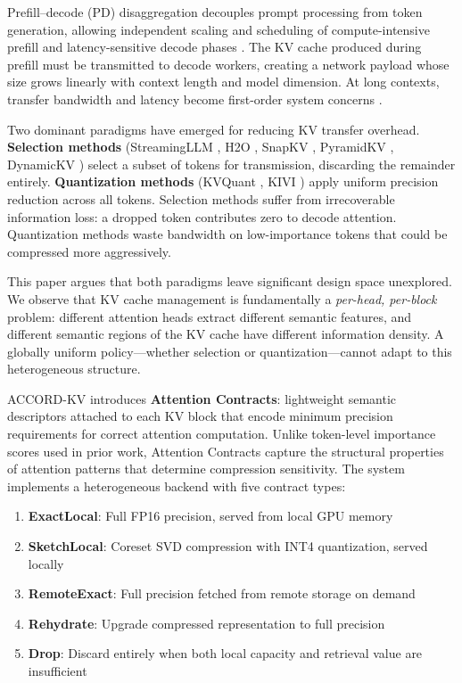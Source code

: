 \documentclass[11pt, a4paper, oneside]{article}
\theoremstyle{myplain}
\theoremstyle{mydefinition}
\theoremstyle{myremark}
\begin{document}
Pre\-fill--decode (PD) disaggregation decouples prompt processing from token generation, allowing independent scaling and scheduling of compute-intensive pre\-fill and latency-sensitive decode phases \cite{patel2024splitwise, zhong2024distserve, qin2024mooncake}. The KV cache produced during pre\-fill must be transmitted to decode workers, creating a network payload whose size grows linearly with context length and model dimension. At long contexts, transfer bandwidth and latency become first-order system concerns \cite{li2025flowkv, liu2026kvserve}.

Two dominant paradigms have emerged for reducing KV transfer overhead. \textbf{Selection methods} (StreamingLLM \cite{xiao2024efficient}, H2O \cite{zhang2023heavy}, SnapKV \cite{li2024snapkv}, PyramidKV \cite{cai2024pyramidkv}, DynamicKV \cite{zhou2024dynamic}) select a subset of tokens for transmission, discarding the remainder entirely. \textbf{Quantization methods} (KVQuant \cite{hooper2024kvquant}, KIVI \cite{liu2024kivi}) apply uniform precision reduction across all tokens. Selection methods suffer from irrecoverable information loss: a dropped token contributes zero to decode attention. Quantization methods waste bandwidth on low-importance tokens that could be compressed more aggressively.

This paper argues that both paradigms leave significant design space unexplored. We observe that KV cache management is fundamentally a \textit{per-head, per-block} problem: different attention heads extract different semantic features, and different semantic regions of the KV cache have different information density. A globally uniform policy---whether selection or quantization---cannot adapt to this heterogeneous structure.

ACCORD-KV introduces \textbf{Attention Contracts}: lightweight semantic descriptors attached to each KV block that encode minimum precision requirements for correct attention computation. Unlike token-level importance scores used in prior work, Attention Contracts capture the structural properties of attention patterns that determine compression sensitivity. The system implements a heterogeneous backend with five contract types:

\begin{enumerate}
    \item \textbf{ExactLocal}: Full FP16 precision, served from local GPU memory
    \item \textbf{SketchLocal}: Coreset SVD compression with INT4 quantization, served locally
    \item \textbf{RemoteExact}: Full precision fetched from remote storage on demand
    \item \textbf{Rehydrate}: Upgrade compressed representation to full precision
    \item \textbf{Drop}: Discard entirely when both local capacity and retrieval value are insufficient
\end{enumerate}
\end{document}
